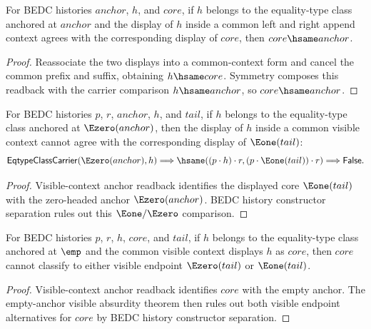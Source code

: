 \begin{theorem}
\label{thm:eqtype-class-carrier-visible-context-anchor-readback}
For BEDC histories $anchor$, $h$, and $core$, if $h$ belongs to the
equality-type class anchored at $anchor$ and the display of $h$ inside a common
left and right append context agrees with the corresponding display of $core$,
then $core\hsame anchor$.
\end{theorem}
\begin{proof}
Reassociate the two displays into a common-context form and cancel the common
prefix and suffix, obtaining $h\hsame core$. Symmetry composes this readback
with the carrier comparison $h\hsame anchor$, so $core\hsame anchor$.
\end{proof}

\begin{theorem}
\label{thm:eqtype-class-carrier-visible-context-e0-anchor-e1-tail-absurd}
For BEDC histories $p$, $r$, $anchor$, $h$, and $tail$, if $h$ belongs to the
equality-type class anchored at $\Ezero(anchor)$, then the display of $h$ inside
a common visible context cannot agree with the corresponding display of
$\Eone(tail)$:
$$
\mathsf{EqtypeClassCarrier}(\Ezero(anchor),h)
\Longrightarrow
\hsame((p\cdot h)\cdot r,(p\cdot\Eone(tail))\cdot r)
\Longrightarrow
\mathsf{False}.
$$
\end{theorem}
\begin{proof}
Visible-context anchor readback identifies the displayed core
$\Eone(tail)$ with the zero-headed anchor $\Ezero(anchor)$. BEDC history
constructor separation rules out this $\Eone/\Ezero$ comparison.
\end{proof}

\begin{theorem}
\label{thm:eqtype-visible-context-empty-anchor-visible-core-absurd}
For BEDC histories $p$, $r$, $h$, $core$, and $tail$, if $h$ belongs to the
equality-type class anchored at $\emp$ and the common visible context displays
$h$ as $core$, then $core$ cannot classify to either visible endpoint
$\Ezero(tail)$ or $\Eone(tail)$.
\end{theorem}
\begin{proof}
Visible-context anchor readback identifies $core$ with the empty anchor. The
empty-anchor visible absurdity theorem then rules out both visible endpoint
alternatives for $core$ by BEDC history constructor separation.
\end{proof}

